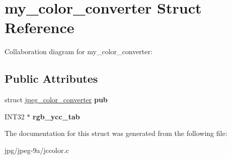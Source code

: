 \hypertarget{structmy__color__converter}{\section{my\+\_\+color\+\_\+converter Struct Reference}
\label{structmy__color__converter}
}


Collaboration diagram for my\+\_\+color\+\_\+converter\+:
\subsection*{Public Attributes}
\begin{DoxyCompactItemize}
\item 
\hypertarget{structmy__color__converter_a6dbeef88bd91b6e62d940ad245474768}{struct \hyperlink{structjpeg__color__converter}{jpeg\+\_\+color\+\_\+converter} {\bfseries pub}}\label{structmy__color__converter_a6dbeef88bd91b6e62d940ad245474768}

\item 
\hypertarget{structmy__color__converter_a783865e631ba6e4e903fcfad6625ec2f}{I\+N\+T32 $\ast$ {\bfseries rgb\+\_\+ycc\+\_\+tab}}\label{structmy__color__converter_a783865e631ba6e4e903fcfad6625ec2f}

\end{DoxyCompactItemize}


The documentation for this struct was generated from the following file\+:\begin{DoxyCompactItemize}
\item 
jpg/jpeg-\/9a/jccolor.\+c\end{DoxyCompactItemize}
